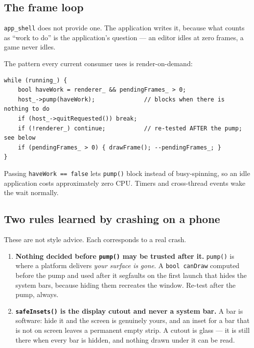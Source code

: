 \documentclass[11pt,a4paper]{article}
\begin{document}
\subsection{The frame loop}
\label{sec:loop}

\texttt{app\_shell} does not provide one. The application writes it, because
what counts as ``work to do'' is the application's question --- an editor idles
at zero frames, a game never idles.

The pattern every current consumer uses is render-on-demand:

\begin{lstlisting}
while (running_) {
    bool haveWork = renderer_ && pendingFrames_ > 0;
    host_->pump(haveWork);              // blocks when there is nothing to do
    if (host_->quitRequested()) break;
    if (!renderer_) continue;           // re-tested AFTER the pump; see below
    if (pendingFrames_ > 0) { drawFrame(); --pendingFrames_; }
}
\end{lstlisting}

Passing \texttt{haveWork == false} lets \texttt{pump()} block instead of
busy-spinning, so an idle application costs approximately zero CPU. Timers and
cross-thread events wake the wait normally.

\subsection{Two rules learned by crashing on a phone}

These are not style advice. Each corresponds to a real crash.

\begin{enumerate}[leftmargin=*]
\item \textbf{Nothing decided before \texttt{pump()} may be trusted after it.}
  \texttt{pump()} is where a platform delivers \emph{your surface is gone}. A
  \texttt{bool canDraw} computed before the pump and used after it segfaults on
  the first launch that hides the system bars, because hiding them recreates the
  window. Re-test after the pump, always.

\item \textbf{\texttt{safeInsets()} is the display cutout and never a system
  bar.} A bar is software: hide it and the screen is genuinely yours, and an
  inset for a bar that is not on screen leaves a permanent empty strip. A cutout
  is glass --- it is still there when every bar is hidden, and nothing drawn
  under it can be read.
\end{enumerate}
\end{document}
